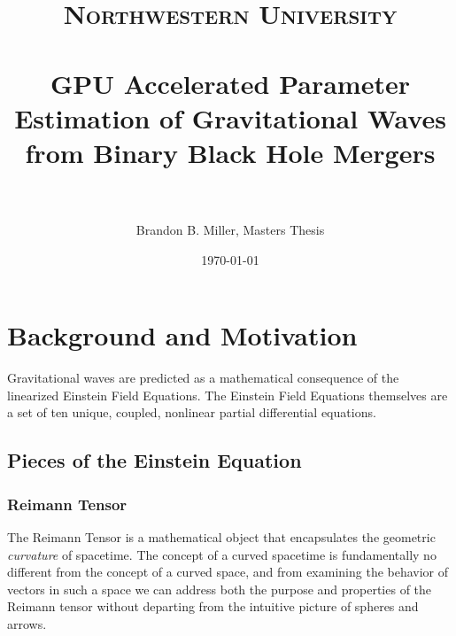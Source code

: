 \documentclass[paper=a4, fontsize=11pt]{scrartcl} %
\title{	
\normalfont \normalsize 
\textsc{Northwestern University} \\ [25pt] %
\horrule{0.5pt} \\[0.4cm] %
\huge GPU Accelerated Parameter Estimation of Gravitational Waves from Binary Black Hole Mergers \\ %
\horrule{2pt} \\[0.5cm] %
}
\author{Brandon B. Miller, Masters Thesis} %
\date{\normalsize\today} %
\numberwithin{equation}{section} %
\numberwithin{figure}{section} %
\numberwithin{table}{section} %
\begin{document}
\maketitle %
\newpage
\section{Background and Motivation}

Gravitational waves are predicted as a mathematical consequence of the linearized Einstein Field Equations. The Einstein Field Equations themselves are a set of ten unique, coupled, nonlinear partial differential equations.  

\subsection{Pieces of the Einstein Equation}
\subsubsection{Reimann Tensor}
The Reimann Tensor is a mathematical object that encapsulates the geometric \textit{curvature} of spacetime. The concept of a curved spacetime is fundamentally no different from the concept of a curved space, and from examining the behavior of vectors in such a space we can address both the purpose and properties of the Reimann tensor without departing from the intuitive picture of spheres and arrows.
\end{document}
